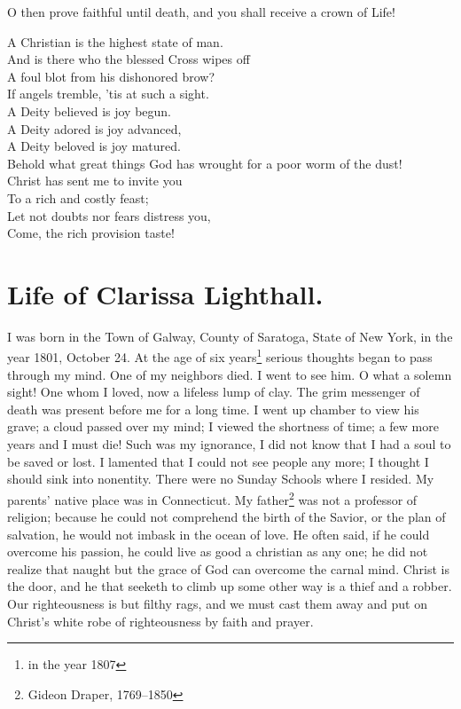 O then prove faithful until death, and you shall receive a crown of Life!
\begin{center}
A Christian is the highest state of man.\\
And is there who the blessed Cross wipes off\\
A foul blot from his dishonored brow?\\
If angels tremble, 'tis at such a sight.\\
A Deity believed is joy begun.\\
A Deity adored is joy advanced,\\
A Deity beloved is joy matured.\\
Behold what great things God has wrought for a poor worm of the dust!\\
Christ has sent me to invite you\\
To a rich and costly feast;\\
Let not doubts nor fears distress you,\\
Come, the rich provision taste!
\end{center}

\markpage%
\section*{Life of Clarissa Lighthall.}
I was born in the Town of Galway, County of Saratoga, State of New York, in the year 1801, October 24.
At the age of six years\footnote{in the year 1807} serious thoughts began to pass through my mind.
One of my neighbors died.
I went to see him.
O what a solemn sight!
One whom I loved, now a lifeless lump of clay.
The grim messenger of death was present before me for a long time.
I went up chamber to view his grave; a cloud passed over my mind; I viewed the shortness of time; a few more years and I must die!
Such was my ignorance, I did not know that I had a soul to be saved or lost.
I lamented that I could not see people any more; I thought I should sink into nonentity.
There were no Sunday Schools where I resided.
My parents' native place was in Connecticut.
My father\footnote{Gideon Draper, 1769--1850} was not a professor of religion; because he could not comprehend the birth of the Savior, or the plan of salvation, he would not imbask in the ocean of love.
He often said, if he could overcome his passion, he could live as good a christian as any one; he did not realize that naught but the grace of God can overcome the carnal mind.
Christ is the door, and he that seeketh to climb up some other way is a thief and a robber.
Our righteousness is but filthy rags, and we must cast them away and put on Christ's white robe of righteousness by faith and prayer.

